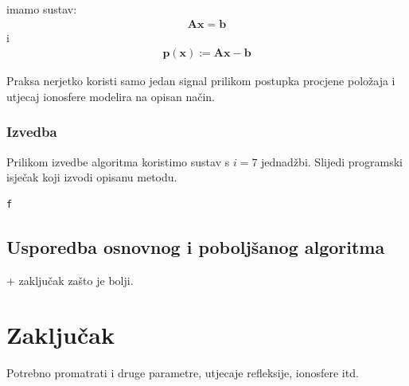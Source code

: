 \documentclass[a4paper,twoside,12pt]{memoir} %
\begin{document}
imamo sustav:
\begin{align*}
\mathbf{A}\mathbf{x} = \mathbf{b}
\end{align*} i
\begin{align*}
\mathbf{p}(\mathbf{x}) := \mathbf{A}\mathbf{x} - \mathbf{b}
\end{align*}


Praksa nerjetko koristi samo jedan signal prilikom postupka procjene položaja i utjecaj ionosfere modelira 
na opisan način.

\subsubsection{Izvedba}
Prilikom izvedbe algoritma koristimo sustav s $i = 7$ jednadžbi.
Slijedi programski isječak koji izvodi opisanu metodu.
\begin{lstlisting}[language=R]
f
\end{lstlisting}




\subsection{Usporedba osnovnog i poboljšanog algoritma} + zaključak zašto je bolji.

\section{Zaključak}
Potrebno promatrati i druge parametre, utjecaje refleksije, ionosfere itd.






\pagestyle{empty} %

\end{document}
